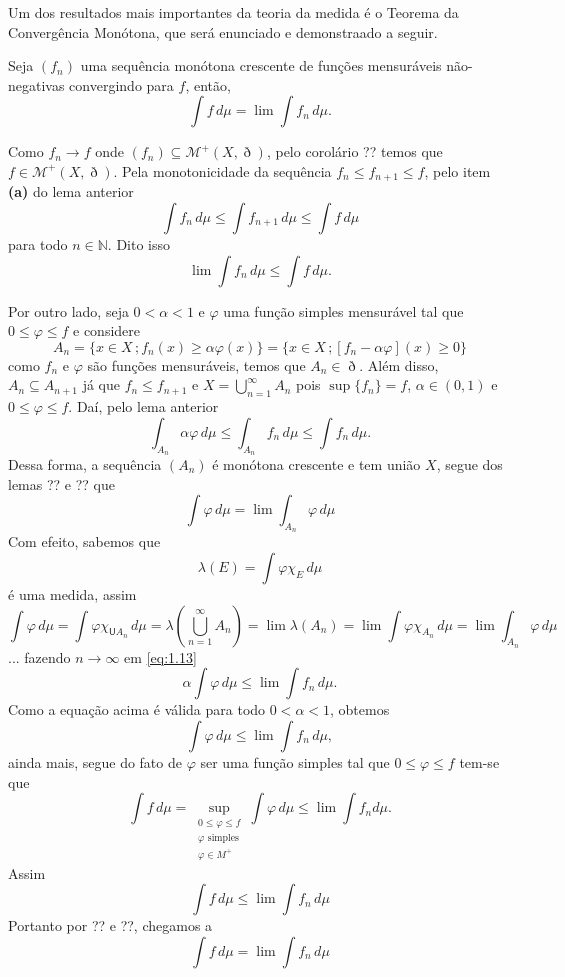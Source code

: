 \documentclass[a4paper, 11pt]{book}
\theoremstyle{definition}
\newcommand{\medcup}{\mathsf{U}}
\newcommand{\bN}{\mathbb{N}}
\newcommand{\cM}{\mathcal{M}}
\begin{document}
Um dos resultados mais importantes da teoria da medida é o Teorema da Convergência Monótona, que será enunciado e demonstraado a seguir.

\begin{tbox} \label{thm:teorema-da-convergencia-monotona}
    Seja $(f_n)$ uma sequência monótona crescente de funções mensuráveis não-negativas convergindo para $f$, então,
    \[
        \int f \, d\mu = \lim \int f_n \, d \mu.
    \]
\end{tbox}
\begin{prf}
    Como $f_n \to f$ onde $(f_n) \subseteq \cM^+(X,\eth)$, pelo corolário ?? temos que $f \in \cM^+(X,\eth)$.
    Pela monotonicidade da sequência $f_n \leqslant f_{n+1} \leqslant f$, pelo item \textbf{(a)} do lema anterior
    \[
        \int f_n \, d\mu \leqslant \int f_{n+1} \, d\mu \leqslant \int f \, d\mu
    \]
    para todo $n \in \bN$. 
    Dito isso
    \[
        \lim \int f_n \, d\mu \leqslant \int f \, d\mu.
    \]

    Por outro lado, seja $0 < \alpha < 1$ e $\varphi$ uma função simples mensurável tal que $0 \leqslant \varphi \leqslant f$ e considere
    \[
        A_n = \{x \in X \,; f_n(x) \geqslant \alpha \varphi(x)\} = \{x \in X \,; [f_n - \alpha \varphi](x) \geqslant 0\}
    \]
    como $f_n$ e $\varphi$ são funções mensuráveis, temos que $A_n \in \eth$.
    Além disso, $A_n \subseteq A_{n+1}$ já que $f_n \leqslant f_{n+1}$ e $X = \bigcup_{n =1}^{\infty} A_n$ pois $\sup \{f_n\} = f$, $\alpha \in (0,1)$ e $0 \leqslant \varphi \leqslant f$.
    Daí, pelo lema anterior
    \begin{equation} \label{eq:1.13}
        \int_{A_n} \alpha \varphi \,d\mu \leqslant \int_{A_n} f_n \, d\mu \leqslant \int f_n \, d\mu.
    \end{equation}
    Dessa forma, a sequência $(A_n)$ é monótona crescente e tem união $X$, segue dos lemas ?? e ?? que
    \[
        \int \varphi \, d\mu = \lim \int_{A_n} \varphi \, d\mu
    \]
    Com efeito, sabemos que
    \[
        \lambda(E) = \int \varphi \chi_{E} \, d \mu
    \]
    é uma medida, assim
    \[
        \int \varphi \, d\mu = \int \varphi \chi_{\medcup A_n} \, d\mu = \lambda \left( \bigcup_{n=1}^\infty A_n \right) = \lim \lambda(A_n) = \lim \int \varphi \chi_{A_n} \, d\mu = \lim \int_{A_n} \varphi \, d\mu
    \]
    ... fazendo $n \to \infty$ em \ref{eq:1.13}
    \[
        \alpha \int \varphi \, d\mu \leqslant \lim \int f_n \, d\mu.
    \]
    Como a equação acima é válida para todo $0 < \alpha < 1$, obtemos
    \[
        \int \varphi \, d\mu \leqslant \lim \int f_n \, d\mu,
    \]
    ainda mais, segue do fato de $\varphi$ ser uma função simples tal que $0 \leqslant \varphi \leqslant f$ tem-se que
    \[
        \int f \, d\mu = \sup_{\substack{0 \leqslant \varphi \leqslant f \\ \varphi \text{ simples} \\ \varphi \in M^+}} \int \varphi \, d\mu \leqslant \lim \int f_n d \mu.
    \]
    Assim
    \[
        \int f \, d\mu \leqslant \lim \int f_n \, d\mu
    \]
    Portanto por ?? e ??, chegamos a
    \[
        \int f \, d\mu = \lim \int f_n \, d\mu
    \]
\end{prf}
\end{document}
